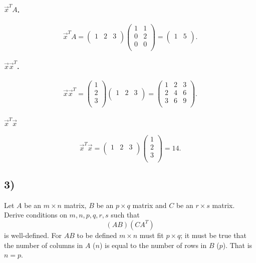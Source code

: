 \paragraph{$\Vec{x}^TA$.}
\[ 
\Vec{x}^T A = \begin{pmatrix}
1 & 2 & 3\\
\end{pmatrix} \begin{pmatrix}
1 & 1\\
0 & 2\\
0 & 0\\
\end{pmatrix} = \begin{pmatrix}
1 & 5\\
\end{pmatrix}
.\]


\paragraph{$\Vec{x}\Vec{x}^T$.}
\[ 
\Vec{x}\Vec{x}^T = \begin{pmatrix}
1\\
2\\
3\\
\end{pmatrix} \begin{pmatrix}
1 & 2 & 3\\
\end{pmatrix} = \begin{pmatrix}
1 & 2 & 3\\
2 & 4 & 6\\
3 & 6 & 9\\
\end{pmatrix}
.\]

\paragraph{$\Vec{x}^T \Vec{x}$}
\[ 
\Vec{x}^T \Vec{x} = \begin{pmatrix}
1 & 2 & 3\\
\end{pmatrix} \begin{pmatrix}
1\\
2\\
3\\
\end{pmatrix} = 14
.\]



\subsection*{3)}
Let $A$ be an $m \times n$ matrix, $B$ be an $p \times q$  matrix and $C$ be an $r\times s$ matrix. Derive conditions on $m, n, p, q, r, s$ such that
\[ 
  \left( AB \right) \left( CA^{T} \right)
\]
is well-defined.
\bigbreak
For $AB$ to be defined $m \times n$ must fit $p \times q$; it must be true that the number of columns in $A$ ($n$) is equal to the number of rows in $B$ ($p$). That is $n = p$.

